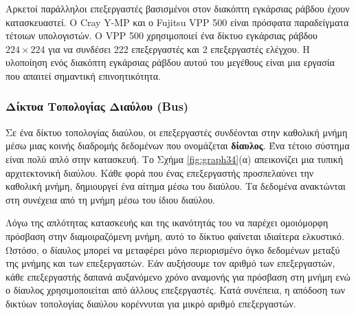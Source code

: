 \documentclass[12pt,a4paper]{article}
\begin{document}
Αρκετοί παράλληλοι επεξεργαστές βασισμένοι στον διακόπτη
εγκάρσιας ράβδου έχουν κατασκευαστεί. Ο
\foreignlanguage{english}{Cray Y-MP} και ο
\foreignlanguage{english}{Fujitsu VPP 500} είναι πρόσφατα παραδείγματα τέτοιων
υπολογιστών. Ο \foreignlanguage{english}{VPP 500} χρησιμοποιεί ένα δίκτυο
εγκάρσιας ράβδου $224 \times 224$ για να συνδέσει 222
επεξεργαστές και 2 επεξεργαστές ελέγχου. Η υλοποίηση ενός διακόπτη
εγκάρσιας ράβδου αυτού του μεγέθους είναι μια εργασία που
απαιτεί σημαντική επινοητικότητα.

\subsubsection{Δίκτυα Τοπολογίας Διαύλου (\foreignlanguage{english}{Bus})}
Σε ένα δίκτυο τοπολογίας διαύλου, οι επεξεργαστές
συνδέονται στην καθολική μνήμη μέσω μιας κοινής διαδρομής δεδομένων που ονομάζεται
\textbf{δίαυλος}. Ένα τέτοιο σύστημα είναι πολύ απλό στην
κατασκευή. Το Σχήμα \ref{fig:graph34}(α) απεικονίζει μια τυπική αρχιτεκτονική
διαύλου. Κάθε φορά που ένας επεξεργαστής προσπελαύνει την
καθολική μνήμη, δημιουργεί ένα αίτημα μέσω του διαύλου. Τα
δεδομένα ανακτώνται στη συνέχεια από τη μνήμη μέσω του ίδιου
διαύλου.

Λόγω της απλότητας κατασκευής και της ικανότητάς του να παρέχει ομοιόμορφη
πρόσβαση στην διαμοιραζόμενη μνήμη, αυτό το δίκτυο φαίνεται ιδιαίτερα ελκυστικό. Ωστόσο,
ο δίαυλος μπορεί να μεταφέρει μόνο περιορισμένο όγκο
δεδομένων μεταξύ της μνήμης και των επεξεργαστών. Εάν αυξήσουμε τον αριθμό των
επεξεργαστών, κάθε επεξεργαστής δαπανά αυξανόμενο χρόνο αναμονής για πρόσβαση
στη μνήμη ενώ ο δίαυλος χρησιμοποιείται από άλλους επεξεργαστές. Κατά συνέπεια, η 
απόδοση των δικτύων τοπολογίας διαύλου κορέννυται για μικρό αριθμό 
επεξεργαστών.
\end{document}
